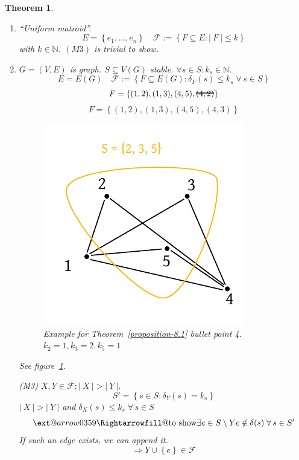 \documentclass{article}
\makeatletter
\newtheorem{theorem}{Theorem}
\newcommand{\card}[1]{\left|\:\!#1\:\!\right|}
\newcommand{\set}[1]{\left\{#1\right\}}
\newcommand{\fall}{\;\forall\,}
\newcommand{\xRightarrow}[2][]{\ext@arrow 0359\Rightarrowfill@{#1}{#2}}
\newcommand\hcancel[2][black]{\setbox0=\hbox{$#2$}%
\rlap{\raisebox{.45\ht0}{\textcolor{#1}{\rule{\wd0}{1pt}}}}#2}
\makeatother
\begin{document}
\begin{theorem}
\begin{enumerate}
    \item ``\emph{Uniform matroid}''. 
      \[ E = \set{e_1, \ldots, e_n} \quad \mathcal{F} := \set{F \subseteq E: \card{F} \leq k} \]
      with $k \in \mathbb{N}$. $(M3)$ is trivial to show.

    \item $G = (V, E)$ is graph. $S \subseteq V(G)$ stable. $\forall s \in S: k_s \in \mathbb{N}$.
      \[ E = E(G) \quad \mathcal{F} := \set{F \subseteq E(G): \delta_F(s) \leq k_s \fall s \in S} \]
      \[ F = \set{(1, 2), (1, 3), (4, 5), \hcancel{(4, 2)}} \]
      \[ F = \set{(1, 2), (1, 3), (4, 5), (4, 3)} \]

      \begin{figure}[!ht]
        \begin{center}
          \includegraphics{img/matroid_example_for_4.pdf}
          \caption{Example for Theorem~\ref{proposition-8.1} bullet point 4. $k_2 = 1, k_3 = 2, k_5 = 1$}
          \label{fig:prop81-4-example}
        \end{center}
      \end{figure}

      See figure~\ref{fig:prop81-4-example}.

      (M3) $X, Y \in \mathcal{F}: \card{X} > \card{Y}$.
      \[
        S' = \set{s \in S: \delta_Y(s) = k_s}
      \]
      $\card{X} > \card{Y}$ and $\delta_X(s) \leq k_s \fall s \in S$
      \[
        \xRightarrow{\text{to show}} 
          \exists e \in S \setminus Y
          e \notin \delta(s)
          \fall s \in S'
      \]
      If such an edge exists, we can append it.
      \[
        \Rightarrow Y \cup \set{e} \in \mathcal{F}
      \]


\end{enumerate}
\end{theorem}
\end{document}
